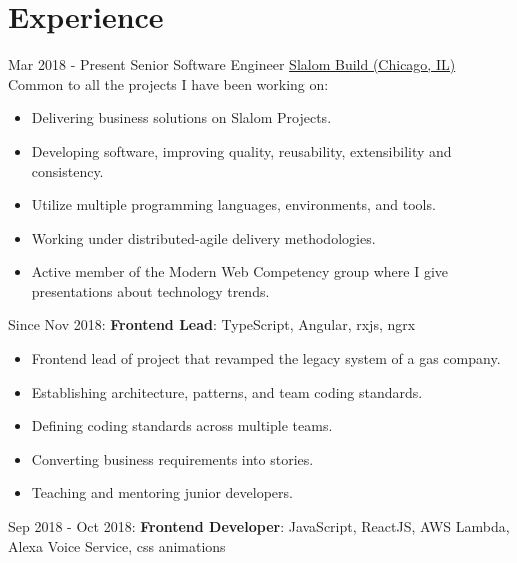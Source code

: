 \documentclass[letterpaper]{template} %
\begin{document}
\makeprofile %


\section{Experience}

\begin{twenty} %
    \twentyitem
    	{Mar 2018 - Present}
		{}
        {Senior Software Engineer}
        {\href{https://www.slalom.com/}{Slalom Build (Chicago, IL)}}
        {Common to all the projects I have been working on:}
        {\begin{itemize}
            \item Delivering business solutions on Slalom Projects.
            \item Developing software, improving quality, reusability, extensibility and consistency.
            \item Utilize multiple programming languages, environments, and tools.
            \item Working under distributed-agile delivery methodologies.
            \item Active member of the Modern Web Competency group where I give presentations about technology trends.
        \end{itemize}}
    \twentyitem
        {}
        {}
        {}
        {}
        {Since Nov 2018: \textbf{Frontend Lead}: TypeScript, Angular, rxjs, ngrx}
        {\begin{itemize}
            \item Frontend lead of project that revamped the legacy system of a gas company.
            \item Establishing architecture, patterns, and team coding standards.
            \item Defining coding standards across multiple teams.
            \item Converting business requirements into stories.
            \item Teaching and mentoring junior developers.
        \end{itemize}}
    \twentyitem
    	{}
		{}
        {}
        {}
        {Sep 2018 - Oct 2018: \textbf{Frontend Developer}: JavaScript, ReactJS, AWS Lambda, Alexa Voice Service, css animations}

\end{twenty}
\end{document}
